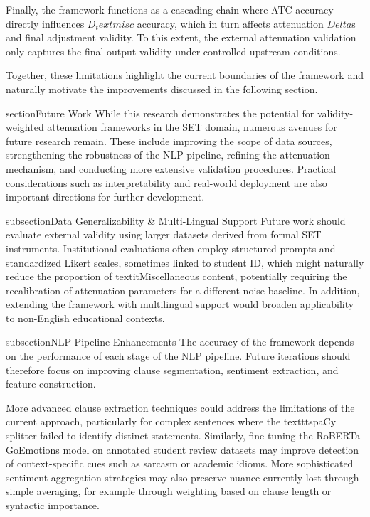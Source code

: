 Finally, the framework functions as a cascading chain where ATC accuracy directly influences $D_text{misc}$ accuracy, which in turn affects attenuation $Delta$s and final adjustment validity. To this extent, the external attenuation validation only captures the final output validity under controlled upstream conditions.

Together, these limitations highlight the current boundaries of the framework and naturally motivate the improvements discussed in the following section.

section{Future Work}
While this research demonstrates the potential for validity-weighted attenuation frameworks in the SET domain, numerous avenues for future research remain. These include improving the scope of data sources, strengthening the robustness of the NLP pipeline, refining the attenuation mechanism, and conducting more extensive validation procedures. Practical considerations such as interpretability and real-world deployment are also important directions for further development.

subsection{Data Generalizability & Multi-Lingual Support}
Future work should evaluate external validity using larger datasets derived from formal SET instruments. Institutional evaluations often employ structured prompts and standardized Likert scales, sometimes linked to student ID, which might naturally reduce the proportion of textit{Miscellaneous} content, potentially requiring the recalibration of attenuation parameters for a different noise baseline. In addition, extending the framework with multilingual support would broaden applicability to non-English educational contexts.

subsection{NLP Pipeline Enhancements}
The accuracy of the framework depends on the performance of each stage of the NLP pipeline. Future iterations should therefore focus on improving clause segmentation, sentiment extraction, and feature construction.

More advanced clause extraction techniques could address the limitations of the current approach, particularly for complex sentences where the texttt{spaCy} splitter failed to identify distinct statements. Similarly, fine-tuning the RoBERTa-GoEmotions model on annotated student review datasets may improve detection of context-specific cues such as sarcasm or academic idioms. More sophisticated sentiment aggregation strategies may also preserve nuance currently lost through simple averaging, for example through weighting based on clause length or syntactic importance.

